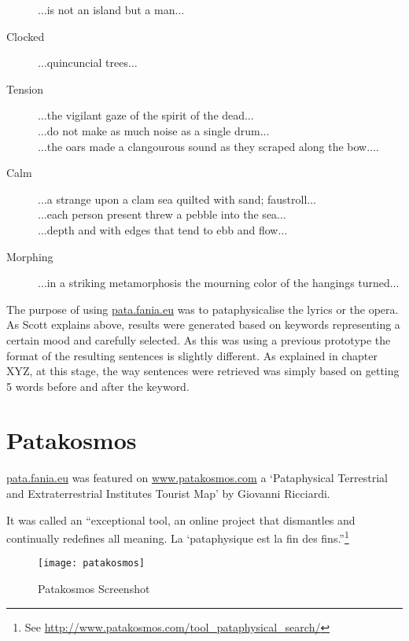 \begin{description}
                $\ldots$is not an island but a man$\ldots$
  \item [Clocked] $\ldots$quincuncial trees$\ldots$
  \item [Tension] $\ldots$the vigilant gaze of the spirit of the dead$\ldots$\\
                    $\ldots$do not make as much noise as a single drum$\ldots$\\
                    $\ldots$the oars made a clangourous sound as they scraped along the bow$\ldots$.
  \item [Calm] $\ldots$a strange upon a clam sea quilted with sand; faustroll$\ldots$\\
                  $\ldots$each person present threw a pebble into the sea$\ldots$\\
                  $\ldots$depth and with edges that tend to ebb and flow$\ldots$
  \item [Morphing] $\ldots$in a striking metamorphosis the mourning color of the hangings turned$\ldots$
\end{description}

\spirals

The purpose of using \url{pata.fania.eu} was to pataphysicalise the lyrics or the opera. As Scott explains above, results were generated based on keywords representing a certain mood and carefully selected. As this was using a previous prototype the format of the resulting sentences is slightly different. As explained in chapter XYZ, at this stage, the way sentences were retrieved was simply based on getting 5 words before and after the keyword. 




\section{Patakosmos}

\url{pata.fania.eu} was featured on \url{www.patakosmos.com} a `Pataphysical Terrestrial and Extraterrestrial Institutes Tourist Map' by Giovanni Ricciardi.

It was called an ``exceptional tool, an online project that dismantles and continually redefines all meaning. La ‘pataphysique est la fin des fins.''\footnote{See \url{http://www.patakosmos.com/tool_pataphysical_search/}}

\begin{figure}[h!]
  \centering
  \texttt{[image: patakosmos]}
\caption[Patakosmos Screenshot]{Patakosmos Screenshot}
\label{fig:patakosmos}
\end{figure}


